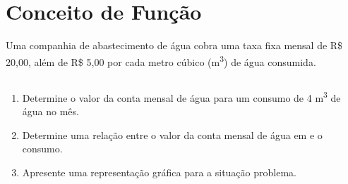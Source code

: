 \section{Conceito de Função}

\begin{frame}
  \begin{example}
    Uma companhia de abastecimento de água cobra uma taxa fixa mensal de R\$ 20,00, além de R\$ 5,00 por cada metro cúbico (m\textsuperscript{3}) de água consumida.
  \end{example}
  \begin{columns}[onlytextwidth]
    \begin{column}{0.4\textwidth}
      \vspace{-0.3cm}
      \begin{enumerate}
        \item Determine o valor da conta mensal de água para um consumo de 4 m\textsuperscript{3} de água no mês.
        \item Determine uma relação entre o valor da conta mensal de água em e o consumo.
        \item Apresente uma representação gráfica para a situação problema.
      \end{enumerate}
    \end{column}

    \begin{column}{0.6\textwidth}
    \end{column}
  \end{columns}
\end{frame}

